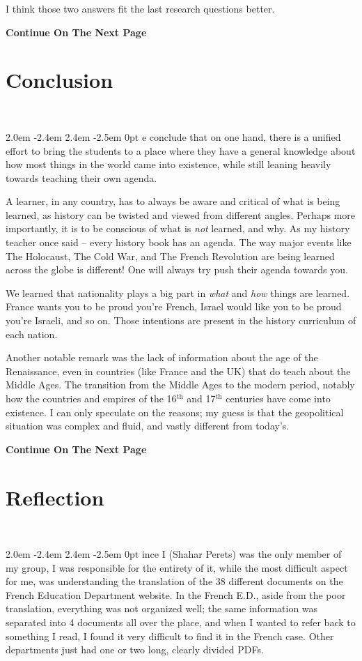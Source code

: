 \documentclass[12pt]{article}
\def\gothstart#1{\noindent\smash{\lower3ex\hbox{\llap{\Huge\gothfamily#1}}}
	\parshape=3 2.0em \dimexpr\hsize-2.4em 2.4em \dimexpr\hsize-2.5em 0pt \hsize}
\newcommand\aftertitle{\ \!\!\!\!\!\!\!\!\!\!}
\newcommand \npage {\vfil {\hfil \textbf{\footnotesize {Continue On The Next Page}}} \hfil \vfil \pagebreak}
\begin{document}
	I think those two answers fit the last research questions better. 
	
	\npage
	\section{Conclusion}\aftertitle
	
	\gothstart We conclude that on one hand, there is a unified effort to bring the students to a place where they have a general knowledge about how most things in the world came into existence, while still leaning heavily towards teaching their own agenda. 
	
	A learner, in any country, has to always be aware and critical of what is being learned, as history can be twisted and viewed from different angles. Perhaps more importantly, it is to be conscious of what is \textit{not} learned, and why. As my history teacher once said -- every history book has an agenda. The way major events like The Holocaust, The Cold War, and The French Revolution are being learned across the globe is different! One will always try push their agenda towards you. 
	
	We learned that nationality plays a big part in \textit{what} and \textit{how} things are learned. France wants you to be proud you're French, Israel would like you to be proud you're Israeli, and so on. Those intentions are present in the history curriculum of each nation. 
	
	Another notable remark was the lack of information about the age of the Renaissance, even in countries (like France and the UK) that do teach about the Middle Ages. The transition from the Middle Ages to the modern period, notably how the countries and empires of the 16$^{\text{th}}$ and 17$^{\text{th}}$ centuries have come into existence. I can only speculate on the reasons; my guess is that the geopolitical situation was complex and fluid, and vastly different from today's. 
	
	\npage
	\section{Reflection}\aftertitle
	
	\gothstart Since I (Shahar Perets) was the only member of my group, I was responsible for the entirety of it, while the most difficult aspect for me, was understanding the translation of the 38 different documents on the French Education Department website. In the French E.D., aside from the poor translation, everything was not organized well; the same information was separated into 4 documents all over the place, and when I wanted to refer back to something I read, I found it very difficult to find it in the French case. Other departments just had one or two long, clearly divided PDFs. 
	
\end{document}
